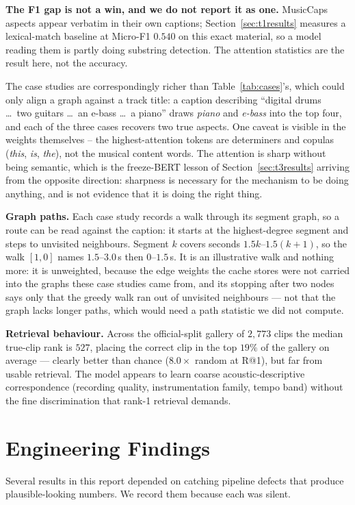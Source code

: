\documentclass[conference]{IEEEtran}
\begin{document}
\textbf{The F1 gap is not a win, and we do not report it as one.} MusicCaps
aspects appear verbatim in their own captions; Section~\ref{sec:t1results}
measures a lexical-match baseline at Micro-F1 $0.540$ on this exact material, so
a model reading them is partly doing substring detection. The attention
statistics are the result here, not the accuracy.

The case studies are correspondingly richer than Table~\ref{tab:cases}'s, which
could only align a graph against a track title: a caption describing
``digital drums \dots\ two guitars \dots\ an e-bass \dots\ a piano'' draws
\emph{piano} and \emph{e-bass} into the top four, and each of the three cases
recovers two true aspects. One caveat is visible in the weights themselves --
the highest-attention tokens are determiners and copulas (\emph{this},
\emph{is}, \emph{the}), not the musical content words. The attention is sharp
without being semantic, which is the freeze-BERT lesson of
Section~\ref{sec:t3results} arriving from the opposite direction: sharpness is
necessary for the mechanism to be doing anything, and is not evidence that it
is doing the right thing.

\noindent \textbf{Graph paths.} Each case study records a walk through its
segment graph, so a route can be read against the caption: it starts at the
highest-degree segment and steps to unvisited neighbours. Segment $k$ covers
seconds $1.5k$--$1.5(k{+}1)$, so the walk $[1,0]$ names $1.5$--$3.0$\,s then
$0$--$1.5$\,s. It is an illustrative walk and nothing more: it is unweighted,
because the edge weights the cache stores were not carried into the graphs these
case studies came from, and its stopping after two nodes says only that the
greedy walk ran out of unvisited neighbours --- not that the graph lacks longer
paths, which would need a path statistic we did not compute.

\noindent \textbf{Retrieval behaviour.} Across the official-split gallery of
$2{,}773$ clips the median true-clip rank is $527$, placing the correct clip in
the top $19\%$ of the gallery on average --- clearly better than chance
($8.0\times$ random at R@1), but far from usable retrieval. The
model appears to learn coarse acoustic-descriptive correspondence (recording
quality, instrumentation family, tempo band) without the fine discrimination
that rank-1 retrieval demands.

\section{Engineering Findings}
\label{sec:engineering}
Several results in this report depended on catching pipeline defects that
produce plausible-looking numbers. We record them because each was silent.
\end{document}
